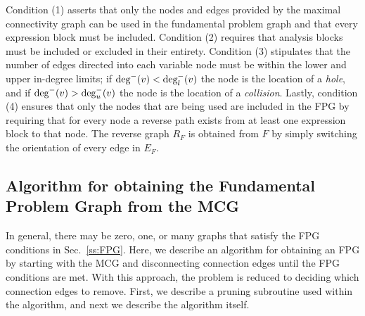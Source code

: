     Condition (1) asserts that only the nodes and edges provided by the maximal connectivity graph can be used in the fundamental problem graph and that every expression block must be included. 
    Condition (2) requires that analysis blocks must be included or excluded in their entirety. 
    Condition (3) stipulates that the number of edges directed into each variable node must be within the lower and upper in-degree limits; 
    if $\textrm{deg}^-(v) < \textrm{deg}_l^-(v)$ the node is the location of a \emph{hole}, and if $\textrm{deg}^-(v) > \textrm{deg}_u^-(v)$ the node is the location of a \emph{collision}.
    Lastly, condition (4) ensures that only the nodes that are being used are included in the FPG by requiring that for every node a reverse path exists from at least one expression block to that node. 
    The reverse graph $R_F$ is obtained from $F$ by simply switching the orientation of every edge in $E_F$.


\subsection{Algorithm for obtaining the Fundamental Problem Graph from the MCG}
    \label{ss:obtaining FPG}
    In general, there may be zero, one, or many graphs that satisfy the FPG conditions in Sec.~\ref{ss:FPG}.
    Here, we describe an algorithm for obtaining an FPG by starting with the MCG and disconnecting connection edges until the FPG conditions are met. 
    With this approach, the problem is reduced to deciding which connection edges to remove. First, we describe a pruning subroutine used within the algorithm, and next we describe the algorithm itself.

